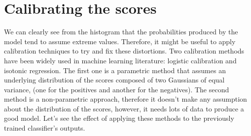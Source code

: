 \documentclass[oneside]{article}\usepackage[]{graphicx}\usepackage[]{color}
\begin{document}
\section*{Calibrating the scores}
We can clearly see from the histogram that the probabilities produced by the model tend to assume extreme values. Therefore, it might be useful to apply calibration techniques to try and fix these distortions. Two calibration methods have been widely used in machine learning literature: logistic calibration and isotonic regression. The first one is a parametric method that assumes an underlying distribution of the scores composed of two Gaussians of equal variance, (one for the positives and another for the negatives). The second method is a non-parametric approach, therefore it doesn't make any assumption about the distribution of the scores, however, it needs lots of data to produce a good model. Let's see the effect of applying these methods to the previously trained classifier's outputs.
\end{document}
